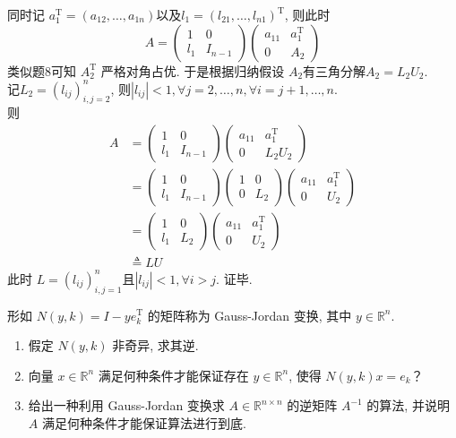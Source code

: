 \documentclass[12pt, answers]{exam}     %
\newcommand{\R}{\mathbb{R}}
\newcommand{\T}{\mathrm{T}}
\begin{document}
\begin{questions}
\begin{solution}
同时记 \( a_1^{\T} = (a_{12}, \ldots, a_{1n}) \)以及\(l_1 = (l_{21}, \ldots, l_{n1})^{\T} \), 则此时
\[ 
A = \begin{pmatrix}
1 & 0 \\
l_1 & I_{n-1}
\end{pmatrix}
\begin{pmatrix}
a_{11} & a_1^{\T} \\
0 & A_2
\end{pmatrix}
\]
类似题8可知 \( A_2^{\T} \) 严格对角占优. 于是根据归纳假设 \( A_2 \)有三角分解\( A_2 = L_2 U_2 \). \\
记\( L_2 = (l_{ij})_{i,j=2}^n \), 则\( |l_{ij}| < 1, \forall j = 2, \ldots, n, \forall i = j + 1, \ldots, n \). \\
则
\begin{align*}
A &= \begin{pmatrix}
1 & 0 \\
l_1 & I_{n-1}
\end{pmatrix}
\begin{pmatrix}
a_{11} & a_1^{\T} \\
0 & L_2 U_2
\end{pmatrix}  \\
&= \begin{pmatrix}
1 & 0 \\
l_1 & I_{n-1}
\end{pmatrix}
\begin{pmatrix}
1 & 0 \\
0 & L_2
\end{pmatrix}
\begin{pmatrix}
a_{11} & a_1^{\T} \\
0 & U_2
\end{pmatrix}  \\
&= \begin{pmatrix}
1 & 0 \\
l_1 & L_2
\end{pmatrix}
\begin{pmatrix}
a_{11} & a_1^{\T} \\
0 & U_2
\end{pmatrix}  \\
&\triangleq LU 
\end{align*}
此时 \( L = (l_{ij})_{i,j=1}^n \)且\( |l_{ij}| < 1, \forall i > j \). 
证毕.
\end{solution}

\question{}
形如 \( N(y, k) = I - y e_k^{\T} \) 的矩阵称为 Gauss-Jordan 变换, 其中 \( y \in \R^n \). 
\begin{enumerate}[label=(\arabic*)]
    \item 假定 \( N(y, k) \) 非奇异, 求其逆.
    \item 向量 \( x \in \R^n \) 满足何种条件才能保证存在 \( y \in \R^n \), 使得 \( N(y, k)x = e_k \)？
    \item 给出一种利用 Gauss-Jordan 变换求 \( A \in \R^{n \times n} \) 的逆矩阵 \( A^{-1} \) 的算法, 并说明 \( A \) 满足何种条件才能保证算法进行到底. 
\end{enumerate}


\end{questions}
\end{document}
